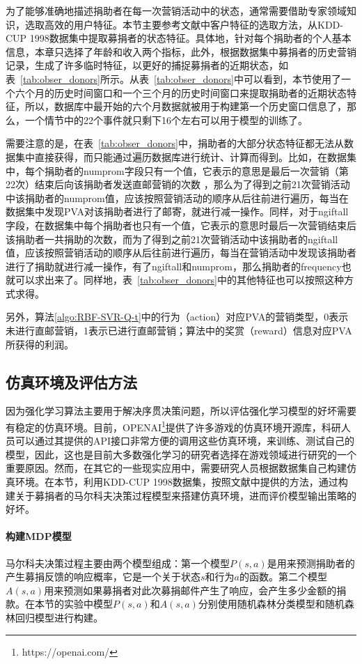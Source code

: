 为了能够准确地描述捐助者在每一次营销活动中的状态，通常需要借助专家领域知识，选取高效的用户特征。本节主要参考文献\citep{tkachenko2015autonomous, pednault2002sequential}中客户特征的选取方法，从KDD-CUP 1998数据集中提取募捐者的状态特征。具体地，针对每个捐助者的个人基本信息，本章只选择了年龄和收入两个指标，此外，根据数据集中募捐者的历史营销记录，生成了许多临时特征，以更好的捕捉募捐者的近期状态，如表~\ref{tab:obser_donors}所示。从表~\ref{tab:obser_donors}中可以看到，本节使用了一个六个月的历史时间窗口和一个三个月的历史时间窗口来提取捐助者的近期状态特征，所以，数据库中最开始的六个月数据就被用于构建第一个历史窗口信息了，那么，一个情节中的22个事件就只剩下16个左右可以用于模型的训练了。

需要注意的是，在表~\ref{tab:obser_donors}中，捐助者的大部分状态特征都无法从数据集中直接获得，而只能通过遍历数据库进行统计、计算而得到。比如，在数据集中，每个捐助者的numprom字段只有一个值，它表示的意思是最后一次营销（第22次）结束后向该捐助者发送直邮营销的次数 ，那么为了得到之前21次营销活动中该捐助者的numprom值，应该按照营销活动的顺序从后往前进行遍历，每当在数据集中发现PVA对该捐助者进行了邮寄，就进行减一操作。同样，对于ngiftall字段，在数据集中每个捐助者也只有一个值，它表示的意思时最后一次营销结束后该捐助者一共捐助的次数，而为了得到之前21次营销活动中该捐助者的ngiftall值，应该按照营销活动的顺序从后往前进行遍历，每当在营销活动中发现该捐助者进行了捐助就进行减一操作，有了ngiftall和numprom，那么捐助者的frequency也就可以求出来了。同样地，表~\ref{tab:obser_donors}中的其他特征也可以按照这种方式求得。

另外，算法\ref{algo:RBF-SVR-Q-t}中的行为（action）对应PVA的营销类型，0表示未进行直邮营销，1表示已进行直邮营销；算法中的奖赏（reward）信息对应PVA所获得的利润。

\subsection{仿真环境及评估方法}
因为强化学习算法主要用于解决序贯决策问题，所以评估强化学习模型的好坏需要有稳定的仿真环境。目前，OPENAI\footnote{https://openai.com/}提供了许多游戏的仿真环境开源库，科研人员可以通过其提供的API接口非常方便的调用这些仿真环境，来训练、测试自己的模型，因此，这也是目前大多数强化学习的研究者选择在游戏领域进行研究的一个重要原因。然而，在其它的一些现实应用中，需要研究人员根据数据集自己构建仿真环境。在本节，利用KDD-CUP 1998数据集，按照文献\citep{pednault2002sequential}中提供的方法，通过构建关于募捐者的马尔科夫决策过程模型来搭建仿真环境，进而评价模型输出策略的好坏。

\paragraph{构建MDP模型}
马尔科夫决策过程主要由两个模型组成：第一个模型$P(s,a)$是用来预测捐助者的产生募捐反馈的响应概率，它是一个关于状态$s$和行为$a$的函数。第二个模型$A(s,a)$用来预测如果募捐者对此次募捐邮件产生了响应，会产生多少金额的捐款。在本节的实验中模型$P(s,a)$和$A(s,a)$分别使用随机森林分类模型和随机森林回归模型进行构建。

